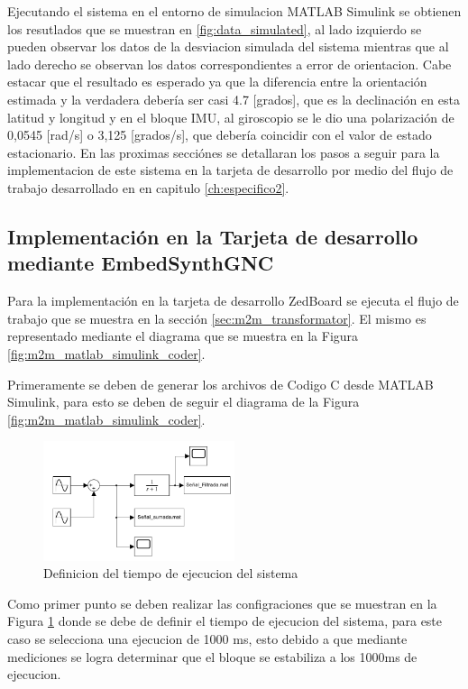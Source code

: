 Ejecutando el sistema en el entorno de simulacion MATLAB Simulink se obtienen los resutlados que se muestran en \ref{fig:data_simulated}, al lado izquierdo se pueden observar los datos de la desviacion simulada del sistema mientras que al lado derecho se observan los datos correspondientes a error de orientacion. Cabe estacar que el resultado es esperado ya que la diferencia entre la orientación estimada y la verdadera debería ser casi 4.7 [grados], que es la declinación en esta latitud y longitud y en el bloque IMU, al giroscopio se le dio una polarización de 0,0545 [rad/s] o 3,125 [grados/s], que debería coincidir con el valor de estado estacionario. En las proximas secciónes se detallaran los pasos a seguir para la implementacion de este sistema en la tarjeta de desarrollo por medio del flujo de trabajo desarrollado en en capitulo \ref{ch:especifico2}. 

\newpage

\subsection{Implementación en la Tarjeta de desarrollo mediante EmbedSynthGNC}


Para la implementación en la tarjeta de desarrollo ZedBoard se ejecuta el flujo de trabajo que se muestra en la sección \ref{sec:m2m_transformator}. El mismo es representado mediante el diagrama que se muestra en la Figura \ref{fig:m2m_matlab_simulink_coder}.

Primeramente se deben de generar los archivos de Codigo C desde MATLAB Simulink, para esto se deben de seguir el diagrama de la Figura \ref{fig:m2m_matlab_simulink_coder}. 

\begin{figure}[h!]
    \centering
    \includegraphics[width=0.5\textwidth]{fig/especifico_2/CASO_ESTUDIO_FILTRO/Diagrama matlab simulink scope.pdf}
    \caption{Definicion del tiempo de ejecucion del sistema}
    \label{fig:system_runtime_IMU}
\end{figure}

Como primer punto se deben realizar las configraciones que se muestran en la Figura \ref{fig:system_runtime_IMU} donde se debe de definir el tiempo de ejecucion del sistema, para este caso se selecciona una ejecucion de 1000 ms, esto debido a que mediante mediciones se logra determinar que el bloque se estabiliza a los 1000ms de ejecucion. 

